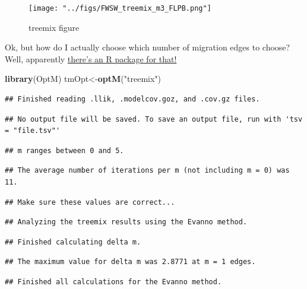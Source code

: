 \documentclass[]{article}
\newenvironment{Shaded}{\begin{snugshade}}{\end{snugshade}}
\newcommand{\KeywordTok}[1]{\textcolor[rgb]{0.13,0.29,0.53}{\textbf{#1}}}
\newcommand{\StringTok}[1]{\textcolor[rgb]{0.31,0.60,0.02}{#1}}
\newcommand{\NormalTok}[1]{#1}
\begin{document}
\begin{figure}
\centering
\texttt{[image: "../figs/FWSW\_treemix\_m3\_FLPB.png"]}
\caption{treemix figure}
\end{figure}

Ok, but how do I actually choose which number of migration edges to
choose? Well, apparently
\href{https://rdrr.io/cran/OptM/\#vignettes}{there's an R package for
that!}

\begin{Shaded}
\begin{Highlighting}[]
\KeywordTok{library}\NormalTok{(OptM)}
\NormalTok{tmOpt<-}\KeywordTok{optM}\NormalTok{(}\StringTok{"treemix"}\NormalTok{)}
\end{Highlighting}
\end{Shaded}

\begin{verbatim}
## Finished reading .llik, .modelcov.goz, and .cov.gz files.
\end{verbatim}

\begin{verbatim}
## No output file will be saved. To save an output file, run with 'tsv = "file.tsv"'
\end{verbatim}

\begin{verbatim}
## m ranges between 0 and 5.
\end{verbatim}

\begin{verbatim}
## The average number of iterations per m (not including m = 0) was 11.
\end{verbatim}

\begin{verbatim}
## Make sure these values are correct...
\end{verbatim}

\begin{verbatim}
## Analyzing the treemix results using the Evanno method.
\end{verbatim}

\begin{verbatim}
## Finished calculating delta m.
\end{verbatim}

\begin{verbatim}
## The maximum value for delta m was 2.8771 at m = 1 edges.
\end{verbatim}

\begin{verbatim}
## Finished all calculations for the Evanno method.
\end{verbatim}
\end{document}
